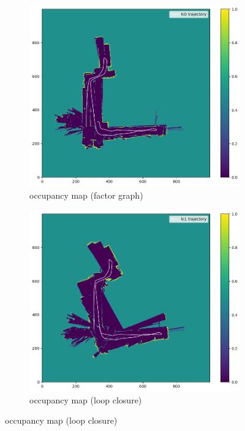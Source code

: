 \documentclass[conference]{IEEEtran}
\begin{document}
\begin{figure}[htbp]
\begin{subfigure}{0.24\textwidth}
        \label{fig:omap_21_icp}
    \end{subfigure}
    \hfill
    \begin{subfigure}{0.24\textwidth}
        \includegraphics[width=\linewidth]{../img/omap_21_lc0.png}
        \caption{occupancy map (factor graph)}
        \label{fig:omap_21_lc0}
    \end{subfigure}
    \hfill
    \begin{subfigure}{0.24\textwidth}
        \includegraphics[width=\linewidth]{../img/omap_21_lc1.png}
        \caption{occupancy map (loop closure)}
        \label{fig:omap_21_lc1}
    \end{subfigure}
    

\end{figure}
\end{document}
